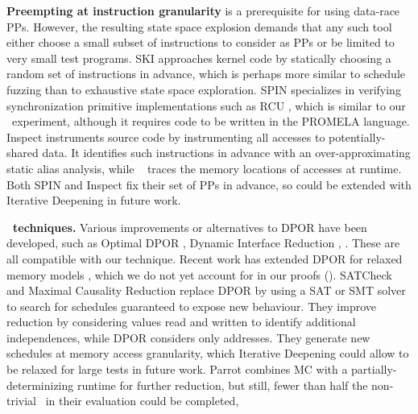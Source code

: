 {\bf Preempting at instruction granularity} is a prerequisite for using data-race PPs.
However, the resulting state space explosion demands that any such tool either
choose a small subset of instructions to consider as PPs
or be limited to very small test programs.
SKI \cite{ski} approaches kernel code by statically choosing a random set of instructions in advance, %
which is perhaps more similar to
schedule fuzzing \cite{randomized-scheduler} than to exhaustive state space exploration.
%
SPIN \cite{spin} specializes in verifying synchronization primitive implementations such as RCU \cite{rcu}, which is similar to our \mxtest~experiment,
although it requires code to be written in the PROMELA language.
%
Inspect \cite{inspect} instruments source code by
instrumenting
all accesses to potentially-shared data.
It identifies such instructions in advance with an over-approximating static alias analysis,
while \landslide~\cite{landslide} traces the memory locations of accesses at runtime.
Both SPIN and Inspect fix their set of PPs in advance, so could be
extended with Iterative Deepening in future work.

{\bf {}~techniques.} Various improvements or alternatives to DPOR have been developed, such as Optimal DPOR \cite{optimal-dpor}, Dynamic Interface Reduction \cite{demeter},
.
These are all compatible with our technique.
%
Recent work \cite{tsopso} has extended DPOR for relaxed memory models \cite{memory-consistency-models},
which we do not yet account for in our proofs (\sect{\ref{sec:soundness}}).
%
SATCheck \cite{satcheck} and Maximal Causality Reduction \cite{mcr} replace DPOR by
using a SAT or SMT solver to search for schedules guaranteed to expose new behaviour.
They improve
reduction by considering values read and written to identify additional independences,
while DPOR considers only addresses.
They generate new schedules at
memory access granularity,
which Iterative Deepening could allow to be relaxed for large tests in future work.
%
Parrot \cite{parrot} combines MC with a partially-determinizing runtime for further reduction, but still, fewer than half the non-trivial ~in their evaluation could be completed,

